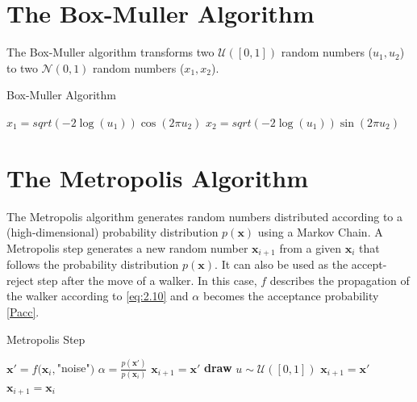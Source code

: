 \documentclass [12pt]{report}
\begin{document}
\begin{appendices}
\chapter{The Box-Muller Algorithm} \label{appendixA}
The Box-Muller algorithm transforms two $\mathcal{U}([0,1])$ random numbers ($u_1, u_2$) to two $\mathcal{N}(0,1)$ random numbers ($x_1, x_2$).

\begin{algorithm}
\caption{Box-Muller Algorithm}\label{box-muller}
\begin{algorithmic}[1]
\State $x_1 = sqrt(-2\log(u_1))\cos(2\pi u_2)$
\State $x_2 = sqrt(-2\log(u_1))\sin(2\pi u_2)$
\EndProcedure
\end{algorithmic}
\end{algorithm}

\chapter{The Metropolis Algorithm} \label{appendixB}
The Metropolis algorithm generates random numbers distributed according to a (high-dimensional) probability distribution $p(\bm{x})$ using a Markov Chain. A Metropolis step generates a new random number $\bm{x}_{i+1}$ from a given $\bm{x}_i$ that follows the probability distribution $p(\bm{x})$. It can also be used as the accept-reject step after the move of a walker. In this case, $f$ describes the propagation of the walker according to \eqref{eq:2.10} and $\alpha$ becomes the acceptance probability \eqref{Pacc}.

\begin{algorithm}
\caption{Metropolis Step}\label{metropolis}
\begin{algorithmic}[1]
\State $\bm{x}' = f(\bm{x}_i,$"noise"$)$ 
\State $\alpha = \frac{p(\bm{x}')}{p(\bm{x}_i)}$
	\State $\bm{x}_{i+1} = \bm{x}'$ 
\Else
	\State \textbf{draw} $u \sim \mathcal{U}([0,1])$
		\State $\bm{x}_{i+1} = \bm{x}'$ 
	\Else
		\State $\bm{x}_{i+1} = \bm{x}_i$ 
	\EndIf
\EndIf 
\EndProcedure
\end{algorithmic}
\end{algorithm}


\end{appendices}
\end{document}
